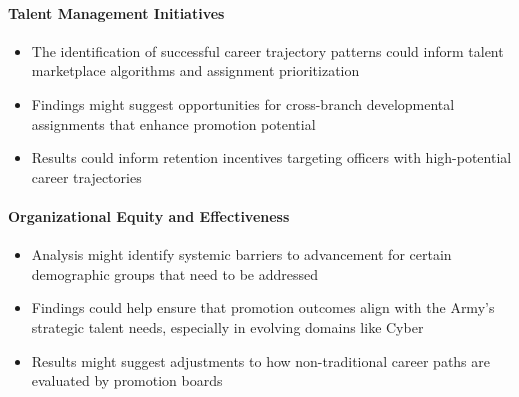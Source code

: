 \documentclass[../main.tex]{subfiles}
\begin{document}
\paragraph{Talent Management Initiatives}
\begin{itemize}
\item The identification of successful career trajectory patterns could inform talent marketplace algorithms and assignment prioritization
\item Findings might suggest opportunities for cross-branch developmental assignments that enhance promotion potential
\item Results could inform retention incentives targeting officers with high-potential career trajectories
\end{itemize}

\paragraph{Organizational Equity and Effectiveness}
\begin{itemize}
\item Analysis might identify systemic barriers to advancement for certain demographic groups that need to be addressed
\item Findings could help ensure that promotion outcomes align with the Army's strategic talent needs, especially in evolving domains like Cyber
\item Results might suggest adjustments to how non-traditional career paths are evaluated by promotion boards
\end{itemize}
\end{document}
